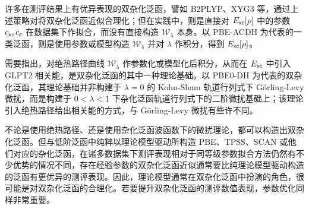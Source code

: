 许多在测评结果上有优异表现的双杂化泛函，譬如 B2PLYP、XYG3 等，通过上述策略对将双杂化泛函近似合理化\cite{Grimme-Grimme.JCP.2006, Zhang-Goddard.PNAS.2009}；但在实践中，则是直接对 $E_{\textsf{xc}} [\rho]$ 中的参数 $c_{\textsf{x}}, c_{\textsf{c}}$ 在数据集下作拟合，而没有直接构造 $\mathcal{W}_{\lambda}$ 本身。以 PBE-ACDH\cite{Su-Xu.JCP.2014} 为代表的一类泛函，则是使用参数或模型构造 $\mathcal{W}_{\lambda}$ 并对 $\lambda$ 作积分，得到 $E_{\textsf{xc}} [\rho]$。

需要指出，对绝热路径曲线 $\mathcal{W}_{\lambda}$ 作参数化或模型化后积分，从而在 $E_{\textsf{xc}}$ 中引入 GLPT2 相关能，是双杂化泛函的其中一种理论基础。以 PBE0-DH\cite{Toulouse-Adamo.JCP.2011} 为代表的双杂化泛函，其理论基础并非构建于 $\lambda = 0$ 的 Kohn-Sham 轨道行列式下 G\"orling-Levy 微扰，而是构建于 $0 < \lambda < 1$ 下杂化泛函轨道行列式下的二阶微扰基础上\cite{Sharkas-Savin.JCP.2011}；该理论引入绝热路径给出相关能的方式，与 G\"orling-Levy 微扰有些许不同。

不论是使用绝热路径、还是使用杂化泛函波函数下的微扰理论，都可以构造出双杂化泛函。但与低阶泛函中纯粹以理论模型驱动所构造 PBE、TPSS、SCAN 或他们对应的杂化泛函，在诸多数据集下测评表现相对于同等级参数拟合方法仍然有不少优势\cite{Goerigk-Grimme.PCCP.2017, Medvedev-Lyssenko.S.2017}的情况不同，存在经验参数的双杂化泛函近似通常要比纯理论模型驱动构造的泛函有更优异的测评表现\cite{Mehta-Goerigk.PCCP.2018}。因此，理论模型通常在双杂化泛函中扮演的角色，很可能是对双杂化泛函的合理化。若要提升双杂化泛函的测评数值表现，参数优化同样非常重要。

